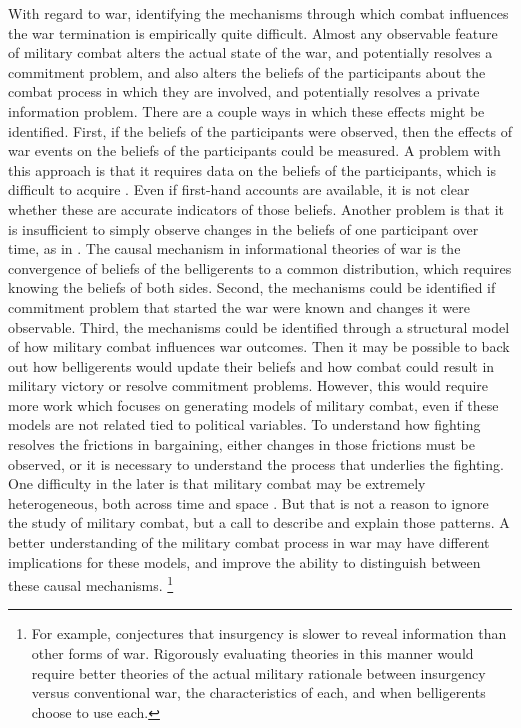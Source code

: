 With regard to war, identifying the mechanisms through which combat influences the war termination is empirically quite difficult.
Almost any observable feature of military combat alters the actual state of the war, and potentially resolves a commitment problem, and also alters the beliefs of the participants about the combat process in which they are involved, and potentially resolves a private information problem.
There are a couple ways in which these effects might be identified. %
First, if the beliefs of the participants were observed, then the effects of war events on the beliefs of the participants could be measured. %
A problem with this approach is that it requires data on the beliefs of the participants, which is difficult to acquire \parencite{Goemans2000}.
Even if first-hand accounts are available, it is not clear whether these are accurate indicators of those beliefs. %
Another problem is that it is insufficient to simply observe changes in the beliefs of one participant over time, as in \textcite{Reiter2009}. %
The causal mechanism in informational theories of war is the convergence of beliefs of the belligerents to a common distribution, which requires knowing the beliefs of both sides.
Second, the mechanisms could be identified if commitment problem that started the war were known and changes it were observable. 
Third, the mechanisms could be identified through a structural model of how military combat influences war outcomes.
Then it may be possible to back out how belligerents would update their beliefs and how combat could result in military victory or resolve commitment problems.
However, this would require more work which focuses on generating models of military combat, even if these models are not related tied to political variables.
To understand how fighting resolves the frictions in bargaining, either changes in those frictions must be observed, or it is necessary to understand the process that underlies the fighting. %
One  difficulty in the later is that  military combat may be extremely heterogeneous, both across time and space \parencite{Reiter2003}.
But that is not a reason to ignore the study of military combat, but a call to describe and explain those patterns.
A better understanding of the military combat process in war may have different implications for these models, and improve the ability to distinguish between these causal mechanisms.%
\footnote{%
  For example, \textcite{Walter2009} conjectures that insurgency is slower to reveal information than other forms of war. %
  Rigorously evaluating theories in this manner would require better theories of the actual military rationale between insurgency versus conventional war, the characteristics of each, and when belligerents choose to use each.
}



